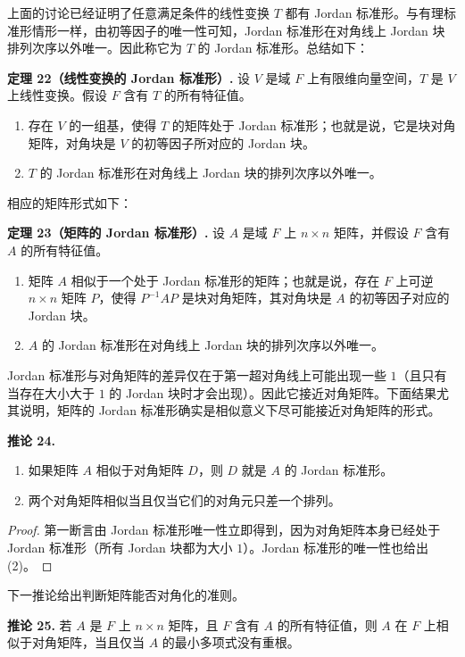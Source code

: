 上面的讨论已经证明了任意满足条件的线性变换 $T$ 都有 Jordan 标准形。与有理标准形情形一样，由初等因子的唯一性可知，Jordan 标准形在对角线上 Jordan 块排列次序以外唯一。因此称它为 $T$ 的 Jordan 标准形。总结如下：

\noindent\textbf{定理 22（线性变换的 Jordan 标准形）.} 设 $V$ 是域 $F$ 上有限维向量空间，$T$ 是 $V$ 上线性变换。假设 $F$ 含有 $T$ 的所有特征值。
\begin{enumerate}[label=(\arabic*)]
\item 存在 $V$ 的一组基，使得 $T$ 的矩阵处于 Jordan 标准形；也就是说，它是块对角矩阵，对角块是 $V$ 的初等因子所对应的 Jordan 块。
\item $T$ 的 Jordan 标准形在对角线上 Jordan 块的排列次序以外唯一。
\end{enumerate}

相应的矩阵形式如下：

\noindent\textbf{定理 23（矩阵的 Jordan 标准形）.} 设 $A$ 是域 $F$ 上 $n\times n$ 矩阵，并假设 $F$ 含有 $A$ 的所有特征值。
\begin{enumerate}[label=(\arabic*)]
\item 矩阵 $A$ 相似于一个处于 Jordan 标准形的矩阵；也就是说，存在 $F$ 上可逆 $n\times n$ 矩阵 $P$，使得 $P^{-1}AP$ 是块对角矩阵，其对角块是 $A$ 的初等因子对应的 Jordan 块。
\item $A$ 的 Jordan 标准形在对角线上 Jordan 块的排列次序以外唯一。
\end{enumerate}

Jordan 标准形与对角矩阵的差异仅在于第一超对角线上可能出现一些 $1$（且只有当存在大小大于 $1$ 的 Jordan 块时才会出现）。因此它接近对角矩阵。下面结果尤其说明，矩阵的 Jordan 标准形确实是相似意义下尽可能接近对角矩阵的形式。

\noindent\textbf{推论 24.}
\begin{enumerate}[label=(\arabic*)]
\item 如果矩阵 $A$ 相似于对角矩阵 $D$，则 $D$ 就是 $A$ 的 Jordan 标准形。
\item 两个对角矩阵相似当且仅当它们的对角元只差一个排列。
\end{enumerate}

\begin{proof}
第一断言由 Jordan 标准形唯一性立即得到，因为对角矩阵本身已经处于 Jordan 标准形（所有 Jordan 块都为大小 $1$）。Jordan 标准形的唯一性也给出 (2)。
\end{proof}

下一推论给出判断矩阵能否对角化的准则。

\noindent\textbf{推论 25.} 若 $A$ 是 $F$ 上 $n\times n$ 矩阵，且 $F$ 含有 $A$ 的所有特征值，则 $A$ 在 $F$ 上相似于对角矩阵，当且仅当 $A$ 的最小多项式没有重根。

